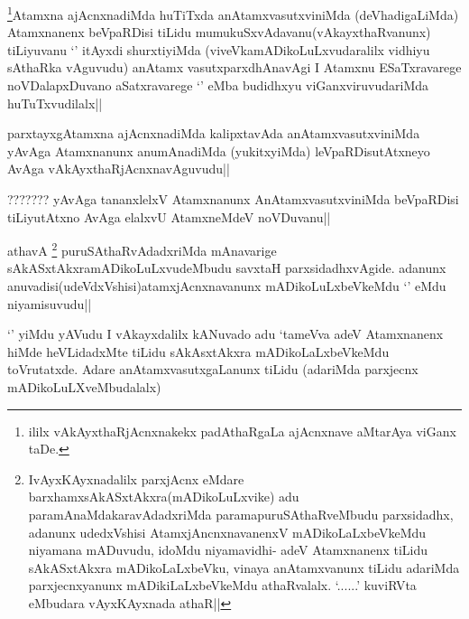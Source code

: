 
\begin{artha}
\footnote{ililx vAkAyxthaRjAcnxnakekx padAthaRgaLa ajAcnxnave aMtarAya viGanx taDe.}Atamxna ajAcnxnadiMda huTiTxda anAtamxvasutxviniMda (deVhadigaLiMda) Atamxnanenx beVpaRDisi tiLidu mumukuSxvAdavanu(vAkayxthaRvanunx) tiLiyuvanu `\stext' itAyxdi shurxtiyiMda (viveVkamADikoLuLxvudaralilx vidhiyu sAthaRka vAguvudu) anAtamx vasutxparxdhAnavAgi I Atamxnu ESaTxravarege noVDalapxDuvano aSatxravarege `\stext' eMba budidhxyu viGanxviruvudariMda huTuTxvudilalx||
\end{artha}


\begin{artha}
parxtayxgAtamxna ajAcnxnadiMda kalipxtavAda anAtamxvasutxviniMda yAvAga Atamxnanunx anumAnadiMda (yukitxyiMda) leVpaRDisutAtxneyo AvAga vAkAyxthaRjAcnxnavAguvudu||
\end{artha}


\begin{artha}
??????? yAvAga tananxlelxV Atamxnanunx AnAtamxvasutxviniMda beVpaRDisi tiLiyutAtxno AvAga elalxvU AtamxneMdeV noVDuvanu||
\end{artha}


\begin{artha}
athavA \footnote{IvAyxKAyxnadalilx parxjAcnx eMdare barxhamxsAkASxtAkxra(mADikoLuLxvike) adu paramAnaMdakaravAdadxriMda paramapuruSAthaRveMbudu parxsidadhx, adanunx udedxVshisi AtamxjAncnxnavanenxV mADikoLaLxbeVkeMdu niyamana mADuvudu, idoMdu niyamavidhi- adeV Atamxnanenx tiLidu sAkASxtAkxra mADikoLaLxbeVku, vinaya anAtamxvanunx tiLidu adariMda parxjecnxyanunx mADikiLaLxbeVkeMdu athaRvalalx. `\stext......' kuviRVta eMbudara vAyxKAyxnada athaR||} puruSAthaRvAdadxriMda mAnavarige sAkASxtAkxramADikoLuLxvudeMbudu savxtaH parxsidadhxvAgide. adanunx anuvadisi(udeVdxVshisi)atamxjAcnxnavanunx mADikoLuLxbeVkeMdu `\stext' eMdu niyamisuvudu||
\end{artha}


\begin{artha}
`\stext' yiMdu yAVudu I vAkayxdalilx kANuvado adu `tameVva adeV Atamxnanenx hiMde heVLidadxMte tiLidu sAkAsxtAkxra mADikoLaLxbeVkeMdu toVrutatxde. Adare anAtamxvasutxgaLanunx tiLidu (adariMda parxjecnx mADikoLuLXveMbudalalx)
\end{artha}

